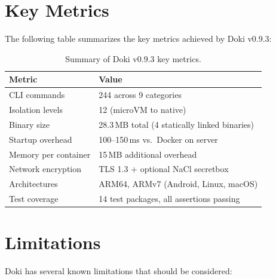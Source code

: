 \section{Key Metrics}
\label{sec:key-metrics}

The following table summarizes the key metrics achieved by Doki v0.9.3:

\begin{table}[htbp]
  \centering
  \caption{Summary of Doki v0.9.3 key metrics.}
  \label{tab:summary-metrics}
  \begin{tabularx}{\textwidth}{l X}
    \toprule
    \textbf{Metric} & \textbf{Value} \\
    \midrule
    CLI commands          & 244 across 9 categories \\
    Isolation levels      & 12 (microVM to native) \\
    Binary size           & 28.3\,MB total (4 statically linked binaries) \\
    Startup overhead      & 100--150\,ms vs.\ Docker on server \\
    Memory per container  & 15\,MB additional overhead \\
    Network encryption    & TLS 1.3 + optional NaCl secretbox \\
    Architectures         & ARM64, ARMv7 (Android, Linux, macOS) \\
    Test coverage         & 14 test packages, all assertions passing \\
    \bottomrule
  \end{tabularx}
\end{table}

\section{Limitations}
\label{sec:limitations}

Doki has several known limitations that should be considered:

